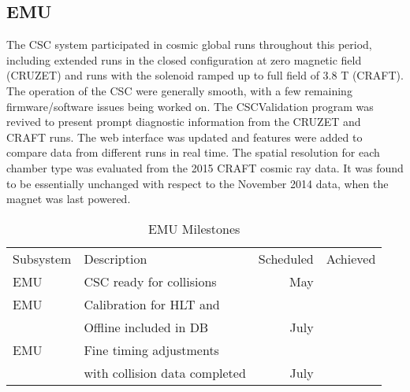 \documentclass[12pt]{article}
\begin{document}
\subsection{EMU}
The CSC system participated in cosmic global runs throughout
this period, including extended runs in the closed
configuration at zero magnetic field (CRUZET) and runs with
the solenoid ramped up to full field of 3.8 T (CRAFT). The
operation of the CSC were generally smooth, with a few
remaining firmware/software issues being worked on.
The CSCValidation program was revived to present prompt
diagnostic information from the CRUZET and CRAFT runs. The web
interface was updated and features were added to compare data
from different runs in real time.
The spatial resolution for each chamber type was evaluated from the
2015 CRAFT cosmic ray data. It was found to be essentially unchanged
with respect to the November 2014 data, when the magnet was last powered.
\begin{table}[htdp]
\caption{EMU Milestones}
\begin{center}
\begin{tabular}{|l|l|r|r|}
\hline
Subsystem&Description&Scheduled&Achieved\\
EMU& CSC ready for collisions& May & \\
\hline
EMU& Calibration for HLT and & &\\
& Offline included in DB & July & \\
\hline
EMU & Fine timing adjustments & & \\
&with collision data completed & July & \\
\hline
\end{tabular}
\end{center}
\label{EMUMilestones}
\end{table}%
\end{document}
